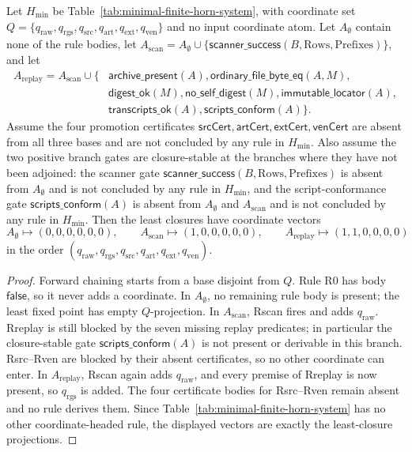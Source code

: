 \documentclass[runningheads]{llncs}
\newcommand{\rawBeginTokenCoord}{q_{\mathrm{raw}}}
\newcommand{\scannerSuccess}{\mathsf{scanner\_success}}
\newcommand{\qlex}{\rawBeginTokenCoord}
\newcommand{\qrgs}{q_{\mathrm{rgs}}}
\newcommand{\qsrc}{q_{\mathrm{src}}}
\newcommand{\qart}{q_{\mathrm{art}}}
\newcommand{\qext}{q_{\mathrm{ext}}}
\newcommand{\qven}{q_{\mathrm{ven}}}
\newcommand{\HornMin}{H_{\mathrm{min}}}
\newcommand{\archivepresent}{\mathsf{archive\_present}}
\newcommand{\ordinaryfilebyteeq}{\mathsf{ordinary\_file\_byte\_eq}}
\newcommand{\digestok}{\mathsf{digest\_ok}}
\newcommand{\noselfdigest}{\mathsf{no\_self\_digest}}
\newcommand{\immutablelocator}{\mathsf{immutable\_locator}}
\newcommand{\transcriptsok}{\mathsf{transcripts\_ok}}
\newcommand{\scriptsconform}{\mathsf{scripts\_conform}}
\newcommand{\RsrcCert}{\mathsf{srcCert}}
\newcommand{\RartCert}{\mathsf{artCert}}
\newcommand{\RextCert}{\mathsf{extCert}}
\newcommand{\RvenCert}{\mathsf{venCert}}
\begin{document}
\begin{proposition}
\label{prop:minimal-horn-least-closure}
Let \(\HornMin\) be Table~\ref{tab:minimal-finite-horn-system}, with coordinate
set \(Q=\{\qlex,\qrgs,\qsrc,\qart,\qext,\qven\}\) and no input coordinate atom.
Let \(A_{\emptyset}\) contain none of the rule bodies,
let \(A_{\mathrm{scan}}=A_{\emptyset}\cup
\{\scannerSuccess(B,\mathrm{Rows},\mathrm{Prefixes})\}\), and let
\[
\begin{aligned}
A_{\mathrm{replay}}=A_{\mathrm{scan}}\cup\{&
\archivepresent(A),\ordinaryfilebyteeq(A,M),\\
&\digestok(M),\noselfdigest(M),\immutablelocator(A),\\
&\transcriptsok(A),\scriptsconform(A)\}.
\end{aligned}
\]
Assume the four promotion certificates
\(\RsrcCert,\RartCert,\RextCert,\RvenCert\) are absent from all three bases and
are not concluded by any rule in \(\HornMin\).  Also assume the two positive
branch gates are closure-stable at the branches where they have not been
adjoined: the scanner gate
\(\scannerSuccess(B,\mathrm{Rows},\mathrm{Prefixes})\) is absent from
\(A_{\emptyset}\) and is not concluded by any rule in \(\HornMin\), and the
script-conformance gate \(\scriptsconform(A)\) is absent from
\(A_{\emptyset}\) and \(A_{\mathrm{scan}}\) and is not concluded by any rule in
\(\HornMin\).  Then the least closures have coordinate vectors
\[
A_{\emptyset}\mapsto(0,0,0,0,0,0),\qquad
A_{\mathrm{scan}}\mapsto(1,0,0,0,0,0),\qquad
A_{\mathrm{replay}}\mapsto(1,1,0,0,0,0)
\]
in the order \((\qlex,\qrgs,\qsrc,\qart,\qext,\qven)\).
\end{proposition}

\begin{proof}
Forward chaining starts from a base disjoint from \(Q\).  Rule R0 has body
\(\mathsf{false}\), so it never adds a coordinate.  In \(A_{\emptyset}\), no
remaining rule body is present; the least fixed point has empty \(Q\)-projection.
In \(A_{\mathrm{scan}}\), Rscan fires and adds \(\qlex\).  Rreplay is still
blocked by the seven missing replay predicates; in particular the
closure-stable gate \(\scriptsconform(A)\) is not present or derivable in this
branch.  Rsrc--Rven are blocked by their absent certificates, so no other
coordinate can enter.  In
\(A_{\mathrm{replay}}\), Rscan again adds \(\qlex\), and every premise of
Rreplay is now present, so \(\qrgs\) is added.  The four certificate bodies for
Rsrc--Rven remain absent and no rule derives them.  Since Table~\ref{tab:minimal-finite-horn-system}
has no other coordinate-headed rule, the displayed vectors are exactly the
least-closure projections.
\end{proof}
\end{document}
